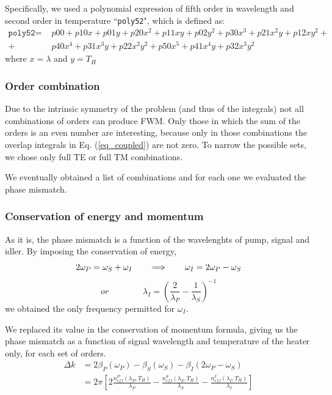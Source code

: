 \documentclass[12pt,a4paper,twoside]{article}
\begin{document}
Specifically, we used a polynomial expression of fifth order in wavelength and second order in temperature ``\texttt{poly52}", which is defined as:
\begin{align*}
	\texttt{poly52} = \,\,
		&p00 
		+ p10x + p01y
		+ p20x^2 + p11xy + p02y^2
		+ p30x^3 + p21x^2y + p12xy^2 +\\
+\,\,	&p40x^4 + p31x^3y + p22x^2y^2 
		+ p50x^5 + p41x^4y + p32x^3y^2
\end{align*}
where $x=\lambda$ and $y=T_H$

\subsubsection{Order combination}

Due to the intrinsic symmetry of the problem (and thus of the integrals) not all combinations of orders can produce FWM.
Only those in which the sum of the orders is an even number are interesting, because only in those combinations the overlap integrals in Eq. (\ref{eq_coupled}) are not zero.
To narrow the possible sets, we chose only full TE or full TM  combinations.

We eventually obtained a list of combinations and for each one we evaluated the phase mismatch.

\subsubsection{Conservation of energy and momentum}
As it is, the phase mismatch is a function of the wavelenghts of pump, signal and idler.
By imposing the conservation of energy,
\begin{equation}
2\omega_P = \omega_S + \omega_I
\qquad \Longrightarrow \qquad
\omega_I = 2\omega_P - \omega_S \\
\end{equation}
$$or \qquad \qquad \lambda_I = \left( \frac{2}{\lambda_P} - \frac{1}{\lambda_S}\right)^{-1} $$
we obtained the only frequency permitted for $\omega_I$.

We replaced its value in the conservation of momentum formula, giving us the phase mismatch as a function of signal wavelength and temperature of the heater only, for each set of orders.
\begin{align*}
	\Delta k &= 2\beta_P(\omega_P)-\beta_S(\omega_S)-\beta_I(2\omega_P-\omega_S)\\
			 &= 2\pi\left[ 2\frac{n_{eff}^P(\lambda_P,T_H)}{\lambda_P}
			 - \frac{n_{eff}^S(\lambda_S,T_H)}{\lambda_S}
			 - \frac{n_{eff}^I(\lambda_I,T_H)}{\lambda_I}\right]
\end{align*}
\end{document}
